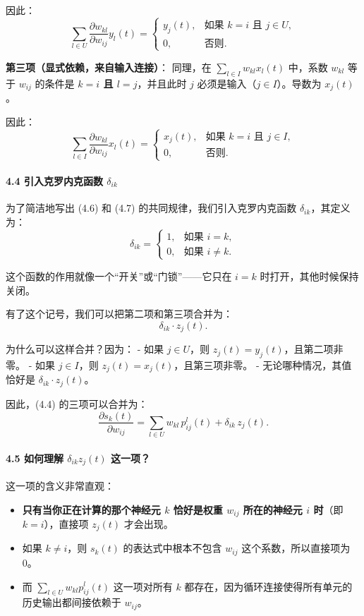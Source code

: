 \documentclass[journal,12pt,onecolumn]{IEEEtran}
\begin{document}
因此：
\[
\sum_{l \in U} \frac{\partial w_{kl}}{\partial w_{ij}} y_l(t) = 
\begin{cases}
y_j(t), & \text{如果 } k=i \text{ 且 } j \in U,\\
0, & \text{否则}.
\end{cases} \tag{4.6}
\]

\textbf{第三项（显式依赖，来自输入连接）}：
同理，在 \(\sum_{l \in I} w_{kl} x_l(t)\) 中，系数 \(w_{kl}\) 等于 \(w_{ij}\) 的条件是 \textbf{\(k=i\) 且 \(l=j\)}，并且此时 \(j\) 必须是输入（\(j \in I\)）。导数为 \(x_j(t)\)。

因此：
\[
\sum_{l \in I} \frac{\partial w_{kl}}{\partial w_{ij}} x_l(t) = 
\begin{cases}
x_j(t), & \text{如果 } k=i \text{ 且 } j \in I,\\
0, & \text{否则}.
\end{cases} \tag{4.7}
\]

\paragraph{4.4 引入克罗内克函数 \(\delta_{ik}\)}

为了简洁地写出 (4.6) 和 (4.7) 的共同规律，我们引入克罗内克函数 \(\delta_{ik}\)，其定义为：
\[
\delta_{ik} = 
\begin{cases}
1, & \text{如果 } i = k,\\
0, & \text{如果 } i \neq k.
\end{cases}
\]

这个函数的作用就像一个“开关”或“门锁”——它只在 \(i=k\) 时打开，其他时候保持关闭。

有了这个记号，我们可以把第二项和第三项合并为：
\[
\delta_{ik} \cdot z_j(t). \tag{4.8}
\]

为什么可以这样合并？因为：
- 如果 \(j \in U\)，则 \(z_j(t) = y_j(t)\)，且第二项非零。
- 如果 \(j \in I\)，则 \(z_j(t) = x_j(t)\)，且第三项非零。
- 无论哪种情况，其值恰好是 \(\delta_{ik} \cdot z_j(t)\)。

因此，(4.4) 的三项可以合并为：
\[
\frac{\partial s_k(t)}{\partial w_{ij}} = \sum_{l \in U} w_{kl} \, p_{ij}^l(t) + \delta_{ik} \, z_j(t). \tag{4.9}
\]

\paragraph{4.5 如何理解 \(\delta_{ik} z_j(t)\) 这一项？}

这一项的含义非常直观：
\begin{itemize}
    \item \textbf{只有当你正在计算的那个神经元 \(k\) 恰好是权重 \(w_{ij}\) 所在的神经元 \(i\) 时}（即 \(k=i\)），直接项 \(z_j(t)\) 才会出现。
    \item 如果 \(k \neq i\)，则 \(s_k(t)\) 的表达式中根本不包含 \(w_{ij}\) 这个系数，所以直接项为 0。
    \item 而 \(\sum_{l \in U} w_{kl} p_{ij}^l(t)\) 这一项对所有 \(k\) 都存在，因为循环连接使得所有单元的历史输出都间接依赖于 \(w_{ij}\)。
\end{itemize}
\end{document}

